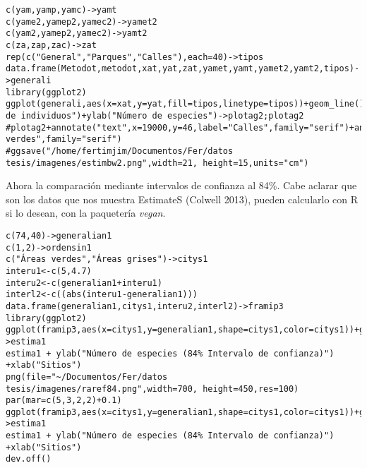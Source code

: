 \documentclass[letterpaper,12pt]{article}
\begin{document}
\begin{lstlisting}
c(yam,yamp,yamc)->yamt
c(yame2,yamep2,yamec2)->yamet2
c(yam2,yamep2,yamec2)->yamt2
c(za,zap,zac)->zat
rep(c("General","Parques","Calles"),each=40)->tipos
data.frame(Metodot,metodot,xat,yat,zat,yamet,yamt,yamet2,yamt2,tipos)->generali
library(ggplot2)
ggplot(generali,aes(x=xat,y=yat,fill=tipos,linetype=tipos))+geom_line()+scale_linetype_manual(values=c("solid","solid","solid"))+geom_point(aes(shape=factor(Metodot,"extrapolacion")))+theme(panel.background=element_blank(),legend.position="none",text=element_text(family="serif"),axis.text.y=element_text(colour="black"),axis.text.x=element_text(colour="black"))+labs(fill="Tipos",linetype="Tipos",shape="Método")+guides(fill=FALSE)+geom_ribbon(aes(ymin=yamet,ymax=yamt),alpha=0.2)+scale_fill_manual(values=c("gray50","gray50","gray50"))+xlab("Número de individuos")+ylab("Número de especies")->plotag2;plotag2
#plotag2+annotate("text",x=19000,y=46,label="Calles",family="serif")+annotate("text",x=20000,y=95,label="General",family="serif")+annotate("text",x=11000,y=90,label="Áreas verdes",family="serif")
#ggsave("/home/fertimjim/Documentos/Fer/datos tesis/imagenes/estimbw2.png",width=21, height=15,units="cm")\end{lstlisting}
Ahora la comparación mediante intervalos de confianza al 84\%. Cabe aclarar que son los datos que nos muestra EstimateS (Colwell 2013), pueden calcularlo con R si lo desean, con la paquetería \textit{vegan}.
\begin{lstlisting}
c(74,40)->generalian1
c(1,2)->ordensin1
c("Áreas verdes","Áreas grises")->citys1
interu1<-c(5,4.7)
interu2<-c(generalian1+interu1)
interl2<-c((abs(interu1-generalian1)))
data.frame(generalian1,citys1,interu2,interl2)->framip3
library(ggplot2)
ggplot(framip3,aes(x=citys1,y=generalian1,shape=citys1,color=citys1))+geom_point(size=12)+geom_line(aes(group=citys1))+geom_errorbar(aes(ymin=interl2,ymax=interu2),linetype="dotted",size=0.8)+theme(panel.background=element_blank(),axis.text.x=element_text(colour="black",size=13),text=element_text(family="serif",size=13),axis.text.y=element_text(colour="black",size=13),legend.position="null",legend.title=element_blank())+scale_color_manual(values=c("Grey10","Black"))+scale_shape_manual(values=c("*","°"))->estima1
estima1 + ylab("Número de especies (84% Intervalo de confianza)") +xlab("Sitios")
png(file="~/Documentos/Fer/datos tesis/imagenes/raref84.png",width=700, height=450,res=100)
par(mar=c(5,3,2,2)+0.1)
ggplot(framip3,aes(x=citys1,y=generalian1,shape=citys1,color=citys1))+geom_point(size=12)+geom_line(aes(group=citys1))+geom_errorbar(aes(ymin=interl2,ymax=interu2),linetype="dotted",size=0.8)+theme(panel.background=element_blank(),axis.text.x=element_text(colour="black",size=13),text=element_text(family="serif",size=13),axis.text.y=element_text(colour="black",size=13),legend.position="null",legend.title=element_blank())+scale_color_manual(values=c("Gray10","Black"))+scale_shape_manual(values=c("*","°"))->estima1
estima1 + ylab("Número de especies (84% Intervalo de confianza)") +xlab("Sitios")
dev.off()

\end{lstlisting}
\end{document}

